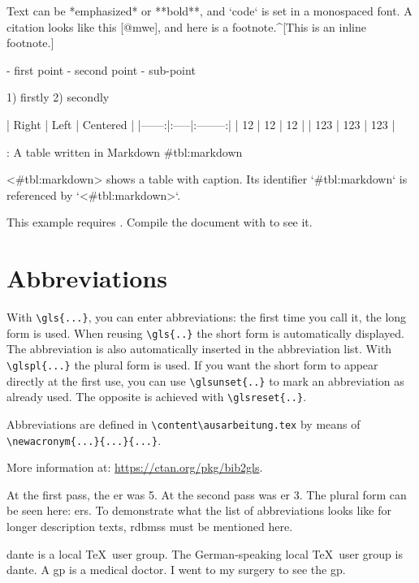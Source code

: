   \begin{ltgexample}
  \begin{markdown}
Text can be *emphasized* or **bold**, and `code` is set in a monospaced font.
A citation looks like this [@mwe], and here is a footnote.^[This is an inline footnote.]

- first point
- second point
  - sub-point

1) firstly
2) secondly

| Right | Left | Centered |
|------:|:-----|:--------:|
|    12 | 12   |    12    |
|   123 | 123  |   123    |

: A table written in Markdown {#tbl:markdown}

<#tbl:markdown> shows a table with caption.
Its identifier `{#tbl:markdown}` is referenced by `<#tbl:markdown>`.
\end{markdown}
  \end{ltgexample}
\else
  This example requires .
  Compile the document with  to see it.
\fi

\section{Abbreviations}

With \verb+\gls{...}+, you can enter abbreviations: the first time you call it, the long form is used.
When reusing \verb+\gls{..}+ the short form is automatically displayed.
The abbreviation is also automatically inserted in the abbreviation list.
With \verb+\glspl{...}+ the plural form is used.
If you want the short form to appear directly at the first use, you can use \verb+\glsunset{..}+ to mark an abbreviation as already used.
The opposite is achieved with \verb+\glsreset{..}+.

Abbreviations are defined in \verb+\content\ausarbeitung.tex+ by means of \verb+\newacronym{...}{...}{...}+.

More information at: \url{https://ctan.org/pkg/bib2gls}.

\begin{ltgexample}
At the first pass, the \gls{er} was 5.
At the second pass was \gls{er} 3.
The plural form can be seen here: \glspl{er}.
To demonstrate what the list of abbreviations looks like for longer description texts, \glspl{rdbms} must be mentioned here.

\gls{dante} is a local \TeX\ user group.
The German-speaking local \TeX\ user group is \gls{dante}.
A \gls{gp} is a medical doctor.
I went to my surgery to see the \gls{gp}.
\end{ltgexample}

